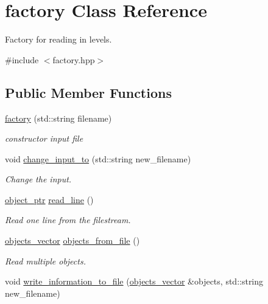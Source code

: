 \hypertarget{classfactory}{}\section{factory Class Reference}
\label{classfactory}


Factory for reading in levels.  




{\ttfamily \#include $<$factory.\+hpp$>$}

\subsection*{Public Member Functions}
\begin{DoxyCompactItemize}
\item 
\hyperlink{classfactory_af422815046ef8b9e95a4d8cb747fc43f}{factory} (std\+::string filename)
\begin{DoxyCompactList}\small\item\em constructor input file \end{DoxyCompactList}\item 
void \hyperlink{classfactory_a9e164a8fbb65188de99c39d55d7cc384}{change\+\_\+input\+\_\+to} (std\+::string new\+\_\+filename)
\begin{DoxyCompactList}\small\item\em Change the input. \end{DoxyCompactList}\item 
\hyperlink{typedefs_8hpp_aab5add95f06d2ba25dbfed8eb07274fa}{object\+\_\+ptr} \hyperlink{classfactory_a82385866bc910c1b3a3e82d56487dd24}{read\+\_\+line} ()
\begin{DoxyCompactList}\small\item\em Read one line from the filestream. \end{DoxyCompactList}\item 
\hyperlink{typedefs_8hpp_a6c0fdb1dfd0c34dbbdbb5dcd3c608b07}{objects\+\_\+vector} \hyperlink{classfactory_afb2fad4ac9b0f39b1bfc3f3fc8d218b6}{objects\+\_\+from\+\_\+file} ()
\begin{DoxyCompactList}\small\item\em Read multiple objects. \end{DoxyCompactList}\item 
void \hyperlink{classfactory_af17f2a44d75cf8ccf712384341c2fcde}{write\+\_\+information\+\_\+to\+\_\+file} (\hyperlink{typedefs_8hpp_a6c0fdb1dfd0c34dbbdbb5dcd3c608b07}{objects\+\_\+vector} \&objects, std\+::string new\+\_\+filename)

\end{DoxyCompactItemize}
